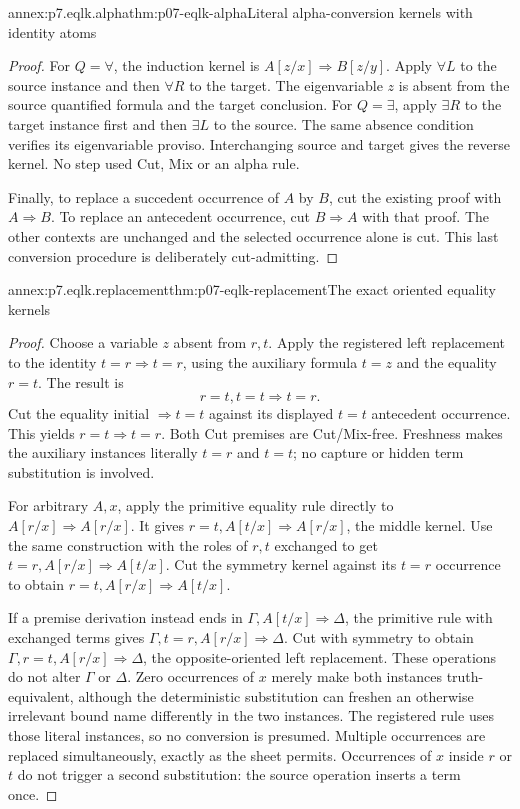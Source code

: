 \begin{annexitem}{annex:p7.eqlk.alpha}{thm:p07-eqlk-alpha}{Literal alpha-conversion kernels with identity atoms}
\begin{proof}
For \(Q=\forall\), the induction kernel is
\(A[z/x]\Rightarrow B[z/y]\). Apply \(\forall L\) to the source
instance and then \(\forall R\) to the target. The eigenvariable
\(z\) is absent from the source quantified formula and the target
conclusion. For \(Q=\exists\), apply \(\exists R\) to the target
instance first and then \(\exists L\) to the source. The same absence
condition verifies its eigenvariable proviso. Interchanging source and
target gives the reverse kernel. No step used Cut, Mix or an alpha rule.

Finally, to replace a succedent occurrence of \(A\) by \(B\), cut
the existing proof with \(A\Rightarrow B\). To replace an antecedent
occurrence, cut \(B\Rightarrow A\) with that proof. The other contexts
are unchanged and the selected occurrence alone is cut. This last
conversion procedure is deliberately cut-admitting.
\end{proof}
\end{annexitem}

\begin{annexitem}{annex:p7.eqlk.replacement}{thm:p07-eqlk-replacement}{The exact oriented equality kernels}
\begin{proof}
Choose a variable \(z\) absent from \(r,t\). Apply the registered left
replacement to the identity \(t=r\Rightarrow t=r\), using the auxiliary
formula \(t=z\) and the equality \(r=t\). The result is
\[
                       r=t,t=t\Rightarrow t=r.
\]
Cut the equality initial \(\Rightarrow t=t\) against its displayed
\(t=t\) antecedent occurrence. This yields \(r=t\Rightarrow t=r\).
Both Cut premises are Cut/Mix-free. Freshness makes the auxiliary
instances literally \(t=r\) and \(t=t\); no capture or hidden term
substitution is involved.

For arbitrary \(A,x\), apply the primitive equality rule directly to
\(A[r/x]\Rightarrow A[r/x]\). It gives
\(r=t,A[t/x]\Rightarrow A[r/x]\), the middle kernel.
Use the same construction with the roles of \(r,t\) exchanged to get
\(t=r,A[r/x]\Rightarrow A[t/x]\). Cut the symmetry kernel against
its \(t=r\) occurrence to obtain
\(r=t,A[r/x]\Rightarrow A[t/x]\).

If a premise derivation instead ends in
\(\Gamma,A[t/x]\Rightarrow\Delta\), the primitive rule with exchanged
terms gives \(\Gamma,t=r,A[r/x]\Rightarrow\Delta\).
Cut with symmetry to obtain
\(\Gamma,r=t,A[r/x]\Rightarrow\Delta\), the opposite-oriented
left replacement. These operations do not alter \(\Gamma\) or
\(\Delta\). Zero occurrences of \(x\) merely make both instances
truth-equivalent, although the deterministic substitution can freshen an
otherwise irrelevant bound name differently in the two instances. The
registered rule uses those literal instances, so no conversion is presumed.
Multiple occurrences are replaced simultaneously, exactly as the sheet
permits. Occurrences of \(x\) inside \(r\) or \(t\) do not
trigger a second substitution: the source operation inserts a term once.
\end{proof}
\end{annexitem}


